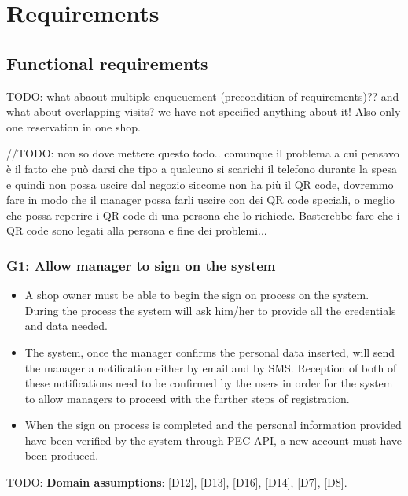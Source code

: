 \section{Requirements}
\label{sect:Specificrequirements}

\subsection{Functional requirements}
\label{subsect:functionalrequirements}

TODO: what abaout multiple enqueuement (precondition of requirements)?? and what about overlapping visits? we have not specified anything about it! Also only one reservation in one shop.

//TODO: non so dove mettere questo todo.. comunque il problema a cui pensavo è il fatto che può darsi che tipo a qualcuno si scarichi il telefono durante la spesa e quindi non possa uscire dal negozio siccome non ha più il QR code, dovremmo fare in modo che il manager possa farli uscire con dei QR code speciali, o meglio che possa reperire i QR code di una persona che lo richiede. Basterebbe fare che i QR code sono legati alla persona e fine dei problemi...

\subsubsection{G1: Allow manager to sign on the system}
\label{subsubsect:G1}

\begin{itemize}[topsep=0pt]
    \item A shop owner must be able to begin the sign on process on the system. During the process the system will ask him/her to provide all the credentials and data needed. 
    \item The system, once the manager confirms the personal data inserted, will send the manager a notification either by email and by SMS. Reception of both of these notifications need to be confirmed by the users in order for the system to allow managers to proceed with the further steps of registration.
    \item When the sign on process is completed and the personal information provided have been verified by the system through PEC API, a new account must have been produced.
\end{itemize}

TODO: \textbf{Domain assumptions}: [D12], [D13], [D16], [D14], [D7], [D8].

